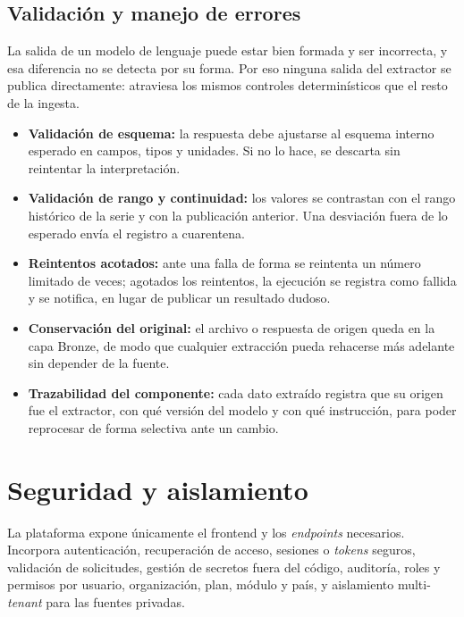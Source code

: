 \documentclass[11pt,a4paper]{article}
\begin{document}
\subsection{Validaci\'on y manejo de errores}

La salida de un modelo de lenguaje puede estar bien formada y ser incorrecta, y
esa diferencia no se detecta por su forma. Por eso ninguna salida del extractor
se publica directamente: atraviesa los mismos controles determin\'isticos que el
resto de la ingesta.

\begin{itemize}
  \item \textbf{Validaci\'on de esquema:} la respuesta debe ajustarse al
        esquema interno esperado en campos, tipos y unidades. Si no lo hace, se
        descarta sin reintentar la interpretaci\'on.
  \item \textbf{Validaci\'on de rango y continuidad:} los valores se contrastan
        con el rango hist\'orico de la serie y con la publicaci\'on anterior.
        Una desviaci\'on fuera de lo esperado env\'ia el registro a cuarentena.
  \item \textbf{Reintentos acotados:} ante una falla de forma se reintenta un
        n\'umero limitado de veces; agotados los reintentos, la ejecuci\'on se
        registra como fallida y se notifica, en lugar de publicar un resultado
        dudoso.
  \item \textbf{Conservaci\'on del original:} el archivo o respuesta de origen
        queda en la capa Bronze, de modo que cualquier extracci\'on pueda
        rehacerse m\'as adelante sin depender de la fuente.
  \item \textbf{Trazabilidad del componente:} cada dato extra\'ido registra que
        su origen fue el extractor, con qu\'e versi\'on del modelo y con qu\'e
        instrucci\'on, para poder reprocesar de forma selectiva ante un cambio.
\end{itemize}

\section{Seguridad y aislamiento}

La plataforma expone \'unicamente el frontend y los \emph{endpoints} necesarios.
Incorpora autenticaci\'on, recuperaci\'on de acceso, sesiones o \emph{tokens}
seguros, validaci\'on de solicitudes, gesti\'on de secretos fuera del c\'odigo,
auditor\'ia, roles y permisos por usuario, organizaci\'on, plan, m\'odulo y
pa\'is, y aislamiento multi-\emph{tenant} para las fuentes privadas.
\end{document}
